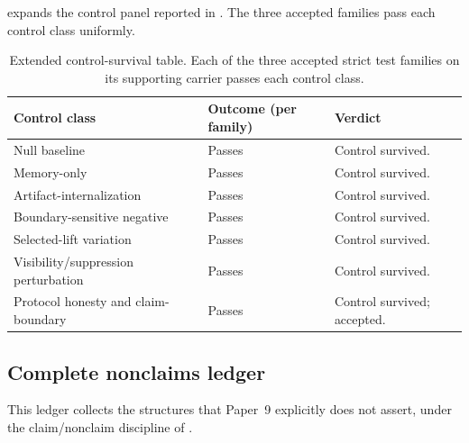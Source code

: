 \documentclass[11pt]{article}
\newcommand{\PaperNine}{Paper~9}
\theoremstyle{definition}
\begin{document}
 expands the control panel reported in
.
The three accepted families pass each control class uniformly.

\begin{table}[tbp]
\centering
\small
\caption{Extended control-survival table.  Each of the three accepted strict
test families on its supporting carrier passes each control class.}
\label{tab:extended-control-survival}
\begin{tabular}{@{}lll@{}}
\toprule
Control class & Outcome (per family) & Verdict \\
\midrule
Null baseline & Passes & Control survived. \\
Memory-only & Passes & Control survived. \\
Artifact-internalization & Passes & Control survived. \\
Boundary-sensitive negative & Passes & Control survived. \\
Selected-lift variation & Passes & Control survived. \\
Visibility/suppression perturbation & Passes & Control survived. \\
Protocol honesty and claim-boundary & Passes & Control survived; accepted. \\
\bottomrule
\end{tabular}
\end{table}

\subsection{Complete nonclaims ledger}\label{subsec:nonclaims-ledger}

This ledger collects the structures that \PaperNine{} explicitly does not
assert, under the claim/nonclaim discipline of
\cite{Tsiokos2026FoundationsII}.
\end{document}
